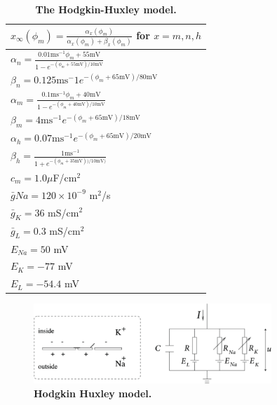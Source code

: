 \begin{table}[h!]
    \caption{\textbf{The Hodgkin-Huxley model.}}
    \label{Neuron:tab:HH}
\begin{center}
    \begin{tabular}{l}
    \hline
    $x_{\infty}(\phi_m) = \frac{\alpha_x(\phi_m)}{\alpha_x(\phi_m) + \beta_x(\phi_m)}$ for $x = m,n,h$ \\ \hline
    $ \alpha_n = \frac{0.01 \mathrm{ms}^{-1} \phi_m+55 \mathrm{mV}}{1-e^{-(\phi_m+55 \mathrm{mV})/10 \mathrm{mV}}}$  \\ \hline
    $ \beta_n = 0.125 \mathrm{ms}^-1 e^{-(\phi_m+65 \mathrm{mV})/80 \mathrm{mV}} $  \\ \hline
    $ \alpha_m = \frac{0.1 \mathrm{ms}^{-1} \phi_m+ 40 \mathrm{mV}} {1-e^{-(\phi_m+40 \mathrm{mV})/10 \mathrm{mV}}}$  \\ \hline
    $\beta_m = 4 \mathrm{ms}^{-1} e^{-(\phi_m+65  \mathrm{mV})/18 \mathrm{mV}} $  \\ \hline
    $\alpha_h = 0.07 \mathrm{ms}^{-1} e^{-(\phi_m+65 \mathrm{mV})/20 \mathrm{mV}}$  \\ \hline
    $\beta_h = \frac{1 \mathrm{ms}^{-1}}{1+e^{-(\phi_m+35 \mathrm{mV}))/10 \mathrm{mV})}} $  \\ \hline
    $c_m = 1.0 \mu $F/cm$^2$ \\ \hline
    $\bar{g}{Na} = 120\times 10^{-9}$ m$^2$/s\\ \hline
    $\bar{g}_{K} = 36$ mS/cm$^2$ \\ \hline
    $\bar{g}_{L} = 0.3$ mS/cm$^2$ \\ \hline
    $E_{Na} = 50$ mV \\ \hline
    $E_{K} = -77$ mV \\ \hline
    $E_{L} = -54.4$ mV \\ \hline
    \end{tabular}
    \end{center}
\end{table}

\begin{figure}[h!]
\begin{center}
\includegraphics[width=0.8\textwidth]{Figures/Neuron/HHmodel.png}
\end{center}
\caption{\textbf{Hodgkin Huxley model.}}
\label{Neuron:fig:HHcircuit}
\end{figure}


